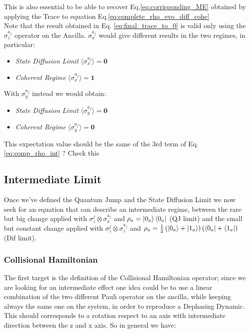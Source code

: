 \documentclass[a4paper,12pt]{article}
\begin{document}
	This is also essential to be able to recover Eq.\ref{eq:corrisponding_ME} obtained by applying the Trace to equation Eq.\ref{eq:complete_rho_evo_diff_cohe}\\

	Note that the result obtained in Eq. \ref{eq:final_trace_to_0} is valid only using the $ \sigma_{z}^{a_j} $ operator on the Ancilla. $ \sigma_{x}^{a_j} $ would give different results in the two regimes, in particular:
	\begin{itemize}
		\item \textit{State Diffusion Limit} $\langle \sigma_{x}^{a_j} \rangle = \textbf{0}$
		\item \textit{Coherent Regime} $\langle \sigma_{x}^{a_j} \rangle = \textbf{1}$
	\end{itemize}

	With $ \sigma_{y}^{a_j} $ instead we would obtain:
	\begin{itemize}
		\item \textit{State Diffusion Limit} $\langle \sigma_{y}^{a_j} \rangle = \textbf{0}$
		\item \textit{Coherent Regime} $\langle \sigma_{y}^{a_j} \rangle = \textbf{0}$
	\end{itemize}

	This expectation value should be the same of the 3rd term of Eq.\ref{eq:comp_rho_int} ? Check this

	\clearpage
	\newpage

	\subsection{Intermediate Limit}
	\label{sec:intermediate_limit}
	Once we've defined the Quantum Jump and the State Diffusion Limit we now seek for an equation that can describe an intermediate regime, between the rare but big change applied with $ \sigma_{z}^{j} \otimes \sigma_{x}^{a_j} $ and $ \rho_a = \ket{0_a}\bra{0_a} $ (QJ limit) and the small but constant change applied with $ \sigma_{z}^{j} \otimes \sigma_{z}^{a_j}$ and $ \rho_a = \frac{1}{2} \left(\ket{0_a} + \ket{1_a}\right)\left(\bra{0_a} + \bra{1_a} \right) $ (Dif limit).

	\subsubsection{Collisional Hamiltonian}
	\label{sub:coll_hamiltonian_int}
	The first target is the definition of the Collisional Hamiltonian operator; since we are looking for an intermediate effect one idea could be to use a linear combination of the two different Pauli operator on the ancilla, while keeping always the same one on the system, in order to reproduce a Dephasing Dynamic. This should corresponds to a rotation respect to an axis with intermediate direction between the z and x axis. So in general we have:
\end{document}
